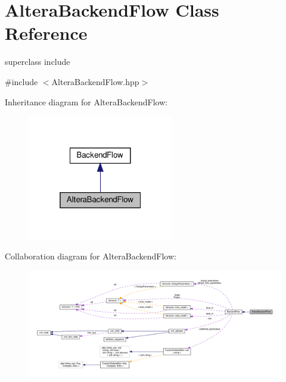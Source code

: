 \hypertarget{classAlteraBackendFlow}{}\section{Altera\+Backend\+Flow Class Reference}
\label{classAlteraBackendFlow}


superclass include  




{\ttfamily \#include $<$Altera\+Backend\+Flow.\+hpp$>$}



Inheritance diagram for Altera\+Backend\+Flow\+:
\nopagebreak
\begin{figure}[H]
\begin{center}
\leavevmode
\includegraphics[width=181pt]{db/d5f/classAlteraBackendFlow__inherit__graph}
\end{center}
\end{figure}


Collaboration diagram for Altera\+Backend\+Flow\+:
\nopagebreak
\begin{figure}[H]
\begin{center}
\leavevmode
\includegraphics[width=350pt]{d5/d3d/classAlteraBackendFlow__coll__graph}
\end{center}
\end{figure}
